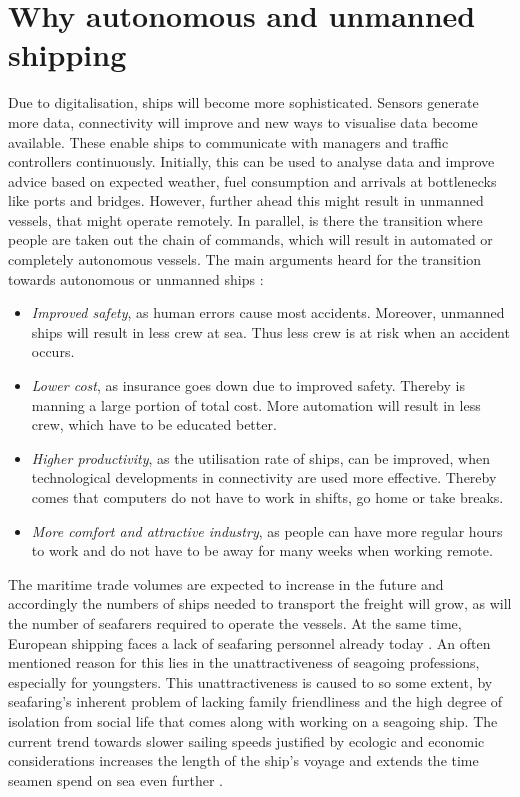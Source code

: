 \section{Why autonomous and unmanned shipping}
Due to digitalisation, ships will become more sophisticated. Sensors generate more data, connectivity will improve and new ways to visualise data become available. These enable ships to communicate with managers and traffic controllers continuously. Initially, this can be used to analyse data and improve advice based on expected weather, fuel consumption and arrivals at bottlenecks like ports and bridges.
However, further ahead this might result in unmanned vessels, that might operate remotely. In parallel, is there the transition where people are taken out the chain of commands, which will result in automated or completely autonomous vessels. The main arguments heard for the transition towards autonomous or unmanned ships \cite{Saarni2018}:
\begin{itemize}
	\item \emph{Improved safety}, as human errors cause most accidents. Moreover, unmanned ships will result in less crew at sea. Thus less crew is at risk when an accident occurs.
	\item \emph{Lower cost}, as insurance goes down due to improved safety. Thereby is manning a large portion of total cost. More automation will result in less crew, which have to be educated better.
	\item \emph{Higher productivity}, as the utilisation rate of ships, can be improved, when technological developments in connectivity are used more effective. Thereby comes that computers do not have to work in shifts, go home or take breaks.
	\item \emph{More comfort and attractive industry}, as people can have more regular hours to work and do not have to be away for many weeks when working remote.
\end{itemize}
The maritime trade volumes are expected to increase in the future and accordingly the numbers of ships needed to transport the freight will grow, as will the number of seafarers required to operate the vessels. At the same time, European shipping faces a lack of seafaring personnel already today \cite{Cahoon2014}. An often mentioned reason for this lies in the unattractiveness of seagoing professions, especially for youngsters. This unattractiveness is caused to so some extent, by seafaring’s inherent problem of lacking family friendliness and the high degree of isolation from social life that comes along with working on a seagoing ship. The current trend towards slower sailing speeds justified by ecologic and economic considerations increases the length of the ship’s voyage and extends the time seamen spend on sea even further \cite{Finnsgard2018}.


